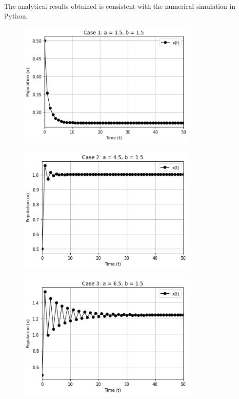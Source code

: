 \documentclass [a4paper]{article}
\begin{document}
The analytical results obtained is consistent with the numerical simulation in Python.
\begin{figure}[h] 
    \centering 
    \includegraphics[width=0.80\textwidth]{Fig 1.png} 
\end{figure}
\newpage
\begin{figure}[h]
    \centering 
    \includegraphics[width=0.80\textwidth]{Fig 2.png} 
\end{figure}
\begin{figure}[h] 
    \centering 
    \includegraphics[width=0.80\textwidth]{Fig 3.png} 
\end{figure}
\end{document}
